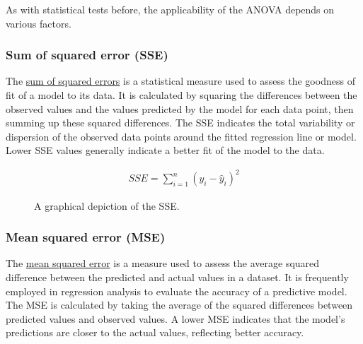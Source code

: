 \documentclass[
  a4paper,
]{scrbook}
\begin{document}
As with statistical tests before, the applicability of the ANOVA depends
on various factors.

\subsubsection{Sum of squared error
(SSE)}\label{sum-of-squared-error-sse}

The \hyperref[sse]{sum of squared errors} is a statistical measure used
to assess the goodness of fit of a model to its data. It is calculated
by squaring the differences between the observed values and the values
predicted by the model for each data point, then summing up these
squared differences. The SSE indicates the total variability or
dispersion of the observed data points around the fitted regression line
or model. Lower SSE values generally indicate a better fit of the model
to the data.

\begin{align}
SSE = \sum_{i=1}^{n} (y_i - \hat{y}_i)^2 \label{sse}
\end{align}

\begin{figure}[H]


\caption{\label{fig-sse}A graphical depiction of the SSE.}

\end{figure}%

\subsubsection{Mean squared error (MSE)}\label{mean-squared-error-mse}

The \hyperref[mse]{mean squared error} is a measure used to assess the
average squared difference between the predicted and actual values in a
dataset. It is frequently employed in regression analysis to evaluate
the accuracy of a predictive model. The MSE is calculated by taking the
average of the squared differences between predicted values and observed
values. A lower MSE indicates that the model's predictions are closer to
the actual values, reflecting better accuracy.
\end{document}
